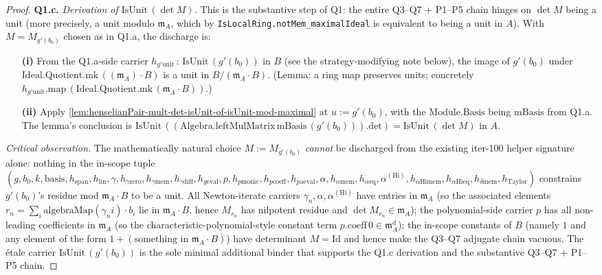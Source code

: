 \begin{proof}
\textbf{Q1.c.} \emph{Derivation of $\mathrm{IsUnit}\,(\det M)$.}
This is the substantive step of Q1: the entire Q3--Q7 + P1--P5
chain hinges on $\det M$ being a unit (more precisely, a unit
modulo $\mathfrak m_A$, which by
\texttt{IsLocalRing.notMem\_maximalIdeal} is equivalent to being
a unit in $A$). With $M = M_{g'(b_0)}$ chosen as in Q1.a, the
discharge is:
\begin{enumerate}
\item[\textbf{(i)}] From the Q1.a-side carrier
$h_{g'\mathrm{unit}}\,:\,\mathrm{IsUnit}\,(g'(b_0))$ in $B$ (see
the strategy-modifying note below), the image of $g'(b_0)$ under
$\mathrm{Ideal.Quotient.mk}\,((\mathfrak m_A) \cdot B)$ is a unit
in $B / (\mathfrak m_A \cdot B)$. (Lemma: a ring map preserves
units; concretely
$h_{g'\mathrm{unit}}.\mathrm{map}\,(\mathrm{Ideal.Quotient.mk}\,
(\mathfrak m_A \cdot B))$.)
\item[\textbf{(ii)}] Apply
\cref{lem:henselianPair-mult-det-isUnit-of-isUnit-mod-maximal}
at $u := g'(b_0)$, with the $\mathrm{Module.Basis}$ being
$\mathrm{mBasis}$ from Q1.a. The lemma's conclusion is
$\mathrm{IsUnit}\,((\mathrm{Algebra.leftMulMatrix}\,
\mathrm{mBasis}\,(g'(b_0))).\mathrm{det})
= \mathrm{IsUnit}\,(\det M)$ in $A$.
\end{enumerate}
\emph{Critical observation.} The mathematically natural choice
$M := M_{g'(b_0)}$ \emph{cannot} be discharged from the
existing iter-100 helper signature alone: nothing in the
in-scope tuple
$(g, b_0, k, \mathrm{basis}, h_{\mathrm{span}}, h_{\mathrm{lin}},
\gamma, h_{\gamma\mathrm{zero}}, h_{\gamma\mathrm{mem}},
h_{\gamma\mathrm{diff}}, h_{g\mathrm{eval}}, p, h_{p\mathrm{monic}},
h_{p\mathrm{coeff}}, h_{p\mathrm{aeval}}, \alpha, h_{\alpha\mathrm{mem}},
h_{\alpha\mathrm{eq}}, \alpha^{(\mathrm{Hi})},
h_{\alpha\mathrm{Hi}\mathrm{mem}}, h_{\alpha\mathrm{Hi}\mathrm{eq}},
h_{\delta\mathrm{mem}}, h_{\mathrm{Taylor}})$
constrains $g'(b_0)$'s residue mod $\mathfrak m_A \cdot B$ to be
a unit. All Newton-iterate carriers $\gamma_n, \alpha,
\alpha^{(\mathrm{Hi})}$ have entries in $\mathfrak m_A$ (so
the associated elements $r_n = \sum_i \mathrm{algebraMap}(\gamma_n
i) \cdot b_i$ lie in $\mathfrak m_A \cdot B$, hence
$M_{r_n}$ has nilpotent residue and $\det M_{r_n} \in
\mathfrak m_A$); the polynomial-side carrier $p$ has all
non-leading coefficients in $\mathfrak m_A$ (so the
characteristic-polynomial-style constant term
$p.\mathrm{coeff}\,0 \in \mathfrak m_A^d$); the in-scope
constants of $B$ (namely $1$ and any element of the form $1 +
(\text{something in } \mathfrak m_A \cdot B)$) have determinant
$M = \mathrm{Id}$ and hence make the Q3--Q7 adjugate chain
vacuous. The étale carrier $\mathrm{IsUnit}\,(g'(b_0))$ is the
sole minimal additional binder that supports the Q1.c
derivation and the substantive Q3--Q7 + P1--P5 chain.


\end{proof}
